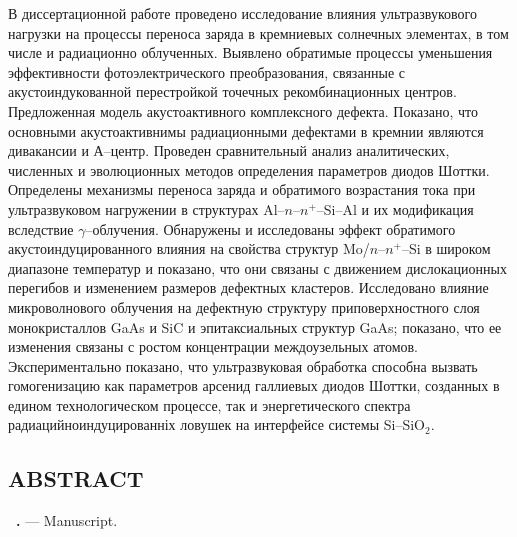 В диссертационной работе проведено исследование влияния ультразвукового нагрузки на процессы переноса заряда в кремниевых солнечных элементах,
 в том числе и радиационно облученных.
 Выявлено обратимые процессы уменьшения эффективности фотоэлектрического преобразования,
 связанные с акустоиндукованной перестройкой точечных рекомбинационных центров.
 Предложенная модель акустоактивного комплексного дефекта.
 Показано, что основными акустоактивнимы радиационными дефектами в кремнии являются дивакансии и А--центр.
 Проведен сравнительный анализ аналитических, численных и эволюционных методов определения параметров диодов Шоттки.
 Определены механизмы переноса заряда и обратимого возрастания тока при ультразвуковом нагружении
 в структурах Al--$n$--$n^+$--Si--Al и их модификация вследствие $\gamma$--облучения.
 Обнаружены и исследованы эффект обратимого акустоиндуцированного влияния на свойства структур Mo/$n$--$n^{+}$--Si в широком диапазоне температур
 и показано, что они связаны с движением дислокационных перегибов и изменением размеров дефектных кластеров.
 Исследовано влияние микроволнового облучения на дефектную структуру приповерхностного слоя монокристаллов GaAs и SiC и эпитаксиальных структур GaAs;
 показано,  что ее изменения связаны с ростом концентрации междоузельных атомов.
 Экспериментально показано, что ультразвуковая обработка способна вызвать гомогенизацию как параметров арсенид галлиевых диодов Шоттки, созданных в едином технологическом процессе, так и энергетического спектра радиацийноиндуцированніх ловушек на интерфейсе системы Si--SiO$_2$.


\keywordsRu


\begin{center}
{\section*{\MakeUppercase{ABSTRACT}}}
\end{center}

\textbf{\thesisAuthorFIOen~\thesisTitleEn.} ---  Manuscript.

\abstractBeginEn


